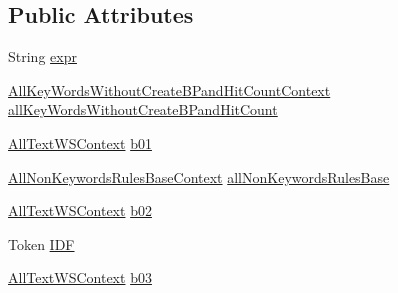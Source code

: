 \subsection*{Public Attributes}
\begin{DoxyCompactItemize}
\item 
String \hyperlink{classgov_1_1nasa_1_1jpf_1_1inspector_1_1client_1_1parser_1_1_console_grammar_parser_1_1_bp_expression_context_a0e0e3f5c70692c59d005e9238cdf7294}{expr}
\item 
\hyperlink{classgov_1_1nasa_1_1jpf_1_1inspector_1_1client_1_1parser_1_1_console_grammar_parser_1_1_all_key_5423188b2439879f44801649cdee10f6}{All\+Key\+Words\+Without\+Create\+B\+Pand\+Hit\+Count\+Context} \hyperlink{classgov_1_1nasa_1_1jpf_1_1inspector_1_1client_1_1parser_1_1_console_grammar_parser_1_1_bp_expression_context_a61284b26cf5a40f97818129ac75ba57c}{all\+Key\+Words\+Without\+Create\+B\+Pand\+Hit\+Count}
\item 
\hyperlink{classgov_1_1nasa_1_1jpf_1_1inspector_1_1client_1_1parser_1_1_console_grammar_parser_1_1_all_text_w_s_context}{All\+Text\+W\+S\+Context} \hyperlink{classgov_1_1nasa_1_1jpf_1_1inspector_1_1client_1_1parser_1_1_console_grammar_parser_1_1_bp_expression_context_a22e0942713aab57270f8114b886fa7db}{b01}
\item 
\hyperlink{classgov_1_1nasa_1_1jpf_1_1inspector_1_1client_1_1parser_1_1_console_grammar_parser_1_1_all_non_keywords_rules_base_context}{All\+Non\+Keywords\+Rules\+Base\+Context} \hyperlink{classgov_1_1nasa_1_1jpf_1_1inspector_1_1client_1_1parser_1_1_console_grammar_parser_1_1_bp_expression_context_a3032f0ac2b10e9168dbf88d836d24941}{all\+Non\+Keywords\+Rules\+Base}
\item 
\hyperlink{classgov_1_1nasa_1_1jpf_1_1inspector_1_1client_1_1parser_1_1_console_grammar_parser_1_1_all_text_w_s_context}{All\+Text\+W\+S\+Context} \hyperlink{classgov_1_1nasa_1_1jpf_1_1inspector_1_1client_1_1parser_1_1_console_grammar_parser_1_1_bp_expression_context_adbd2eba2874c55a213e782c192866c67}{b02}
\item 
Token \hyperlink{classgov_1_1nasa_1_1jpf_1_1inspector_1_1client_1_1parser_1_1_console_grammar_parser_1_1_bp_expression_context_ae274354e8f2efbcc0e967780c6316aba}{I\+DF}
\item 
\hyperlink{classgov_1_1nasa_1_1jpf_1_1inspector_1_1client_1_1parser_1_1_console_grammar_parser_1_1_all_text_w_s_context}{All\+Text\+W\+S\+Context} \hyperlink{classgov_1_1nasa_1_1jpf_1_1inspector_1_1client_1_1parser_1_1_console_grammar_parser_1_1_bp_expression_context_a76c6e5d4ce41e7658fdccaee33436143}{b03}
\end{DoxyCompactItemize}


